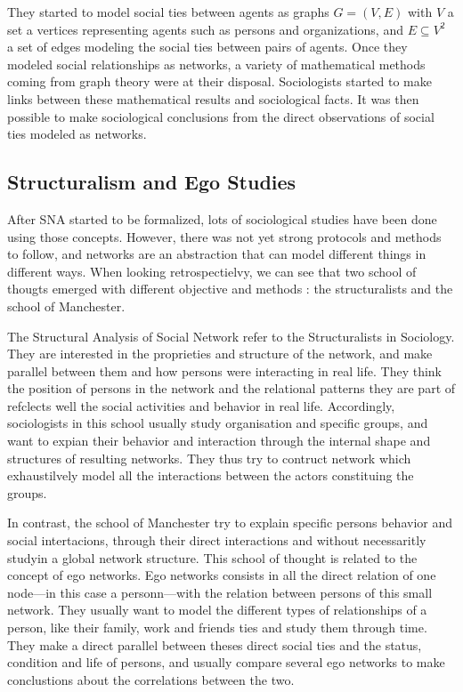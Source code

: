 They started to model social ties between agents as graphs $G = (V, E)$ with $V$ a set a vertices representing agents such as persons and organizations, and $E \subseteq V^2$ a set of edges modeling the social ties between pairs of agents.
Once they modeled social relationships as networks, a variety of mathematical methods coming from graph theory were at their disposal.
Sociologists started to make links between these mathematical results and sociological facts. It was then possible to make sociological conclusions from the direct observations of social ties modeled as networks.



\subsection{Structuralism and Ego Studies}

After SNA started to be formalized, lots of sociological studies have been done using those concepts. However, there was not yet strong protocols and methods to follow, and networks are an abstraction that can model different things in different ways. When looking retrospectielvy, we can see that two school of thougts emerged with different objective and methods : the structuralists and the school of Manchester.

The Structural Analysis of Social Network refer to the Structuralists in Sociology. They are interested in the proprieties and structure of the network, and make parallel between them and how persons were interacting in real life. They think the position of persons in the network and the relational patterns they are part of refclects well the  social activities and behavior in real life. Accordingly, sociologists in this school usually study organisation and specific groups, and want to expian their behavior and interaction through the internal shape and structures of resulting networks. They thus try to contruct network which exhaustilvely model all the interactions between the actors constituing the groups.

In contrast, the school of Manchester try to explain specific persons behavior and social intertacions, through their direct interactions and without necessaritly studyin a global network structure. This school of thought is related to the concept of ego networks. Ego networks consists in all the direct relation of one node---in this case a personn---with the relation between persons of this small network. They usually want to model the different types of relationships of a person, like their family, work and friends ties and study them through time. They make a direct parallel between theses direct social ties and the status, condition and life of persons, and usually compare several ego networks to make conclustions about the correlations between the two.

